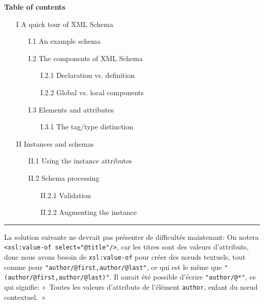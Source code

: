 \noindent\textbf{Table of contents}
\begin{itemize}
  \item [I] A quick tour of XML Schema
    \begin{itemize}
      \item [I.1] An example schema
      \item [I.2] The components of XML Schema
        \begin{itemize}
          \item [I.2.1] Declaration vs. definition
          \item [I.2.2] Global vs. local components
        \end{itemize}
      \item [I.3] Elements and attributes
        \begin{itemize}
          \item [I.3.1] The tag/type distinction
        \end{itemize}
    \end{itemize}
  \item [II] Instances and schemas
    \begin{itemize}
      \item [II.1] Using the instance attributes
      \item [II.2] Schema processing
        \begin{itemize}
          \item [II.2.1] Validation
          \item [II.2.2] Augmenting the instance
        \end{itemize}
    \end{itemize}
\end{itemize}
\noindent\rule{\linewidth}{0.5pt}

\bigskip

\noindent La solution suivante ne devrait pas présenter de difficultés maintenant:
\noindent On notera \texttt{<xsl:value-of select="@title"/>}, car les
titres sont des valeurs d'attributs, donc nous avons besoin de
\texttt{xsl:value-of} pour créer des n{\oe}uds textuels, tout comme
pour \texttt{"author/@first,author/@last"}, ce qui est le même que
\texttt{"(author/@first,author/@last)"}. Il aurait été possible
d'écrire \texttt{"author/@*"}, ce qui signifie: «~Toutes les valeurs
d'attributs de l'élément \texttt{author}, enfant du n{\oe}ud
contextuel.~»

